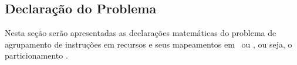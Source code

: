       \subsection{Declaração do Problema} \label{sec:declaracao_problema}
         Nesta seção serão apresentadas as declarações matemáticas do problema de agrupamento de instruções em recursos e seus mapeamentos em \hardware\ ou \software, ou seja, o particionamento \hs.

